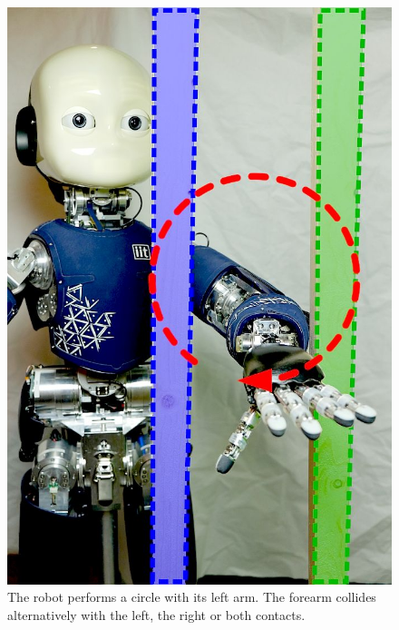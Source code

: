 \documentclass[final,5p,twocolumn]{elsarticle}
\begin{document}
	\begin{figure}[t]
		\begin{minipage}{.43\linewidth}
			\centering
			\includegraphics[width =.94\linewidth]{images/iCubParis02_Double_Contact}
			\caption{The robot performs a circle with its left arm. 
			The forearm collides alternatively with the left, the right or both contacts.}
			\label{fig:exp3:icuparis_experiment_bars}
		\end{minipage}	
		\hfill
		\begin{minipage}{.52\linewidth}
			\centering

\end{minipage}
\end{figure}
\end{document}

